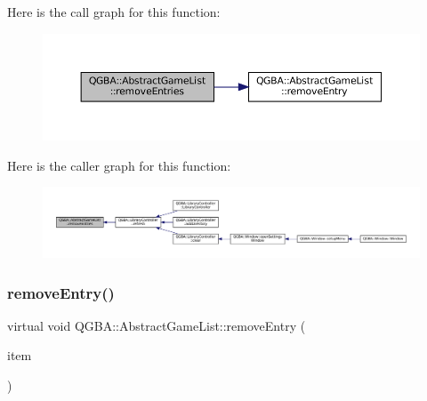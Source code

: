 Here is the call graph for this function\+:
\nopagebreak
\begin{figure}[H]
\begin{center}
\leavevmode
\includegraphics[width=350pt]{class_q_g_b_a_1_1_abstract_game_list_a2dcb6a520d4ab5a4f0e62233f2a296d9_cgraph}
\end{center}
\end{figure}
Here is the caller graph for this function\+:
\nopagebreak
\begin{figure}[H]
\begin{center}
\leavevmode
\includegraphics[width=350pt]{class_q_g_b_a_1_1_abstract_game_list_a2dcb6a520d4ab5a4f0e62233f2a296d9_icgraph}
\end{center}
\end{figure}
\mbox{\label{class_q_g_b_a_1_1_abstract_game_list_ab0745ae397ca851cf29377511b10ee6f}} 
\subsubsection{\texorpdfstring{remove\+Entry()}{removeEntry()}}
{\footnotesize\ttfamily virtual void Q\+G\+B\+A\+::\+Abstract\+Game\+List\+::remove\+Entry (\begin{DoxyParamCaption}\item[{\mbox{\hyperlink{namespace_q_g_b_a_a201fa9f2cb8f778666a134ba81909358}{Library\+Entry\+Ref}}}]{item }\end{DoxyParamCaption})\hspace{0.3cm}{\ttfamily [pure virtual]}}



